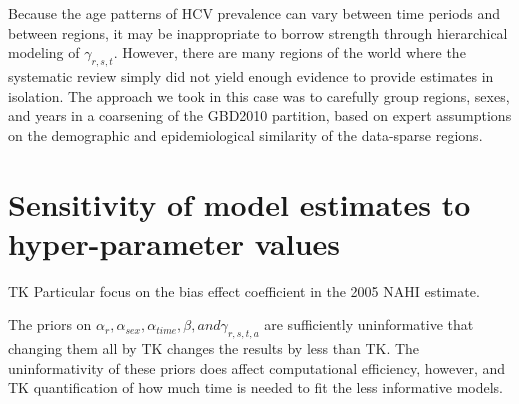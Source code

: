 Because the age patterns of HCV prevalence can vary between time
periods and between regions, it may be inappropriate to borrow
strength through hierarchical modeling of $\gamma_{r,s,t}$.  However,
there are many regions of the world where the systematic review simply
did not yield enough evidence to provide estimates in isolation.  The
approach we took in this case was to carefully group regions, sexes,
and years in a coarsening of the GBD2010 partition, based on expert
assumptions on the demographic and epidemiological similarity of the
data-sparse regions.

\section{Sensitivity of model estimates to hyper-parameter values}

TK Particular focus on the bias effect coefficient in the 2005 NAHI
estimate.

The priors on $\alpha_{r}, \alpha_{sex}, \alpha_{time}, \beta, and
\gamma_{r,s,t,a}$ are sufficiently uninformative that changing them
all by TK changes the results by less than TK.  The uninformativity of
these priors does affect computational efficiency, however, and TK
quantification of how much time is needed to fit the less informative
models.
